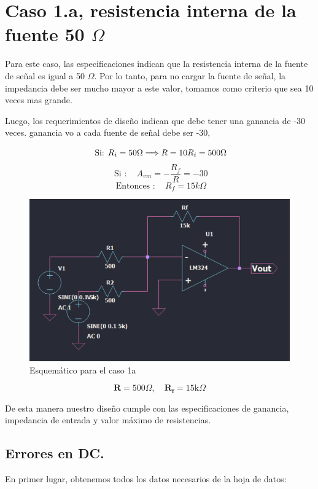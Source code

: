 \section{Caso 1.a, resistencia interna de la fuente 50 $\Omega$}

Para este caso, las especificaciones indican que la resistencia interna de la fuente de señal es igual a 50 $\Omega$. Por lo tanto, para no cargar la fuente de señal, la impedancia debe ser mucho mayor a este valor, tomamos como criterio que sea 10 veces mas grande.

Luego, los requerimientos de diseño indican que debe tener una ganancia de -30 veces. 
ganancia vo a cada fuente de señal debe ser -30, 

\[ \text { Si: } R_{i}=50 \Omega \Longrightarrow R=10 \space R_{i}=500 \Omega \]
\[ \text { Si }: \quad A_{vm} =-\frac{R_{f}}{R}=-30 \]
\[ \text { Entonces }: \quad R_{f}=15 k \Omega \]
\vspace{1em}



\begin{figure}[h!]
    \centering
    \includegraphics[width=0.90\linewidth]{img/caso1a.png}
    \caption{Esquemático para el caso 1a}
    \label{fig:caso1a}
\end{figure}


\[  \mathbf{R}=500 \Omega, \quad \mathbf{R}_{\mathbf{f}}=15 \mathrm{k} \Omega \]


De esta manera nuestro diseño cumple con las especificaciones de ganancia, impedancia de entrada y valor máximo de resistencias.

\vspace{1em}

\subsection{Errores en DC.}
En primer lugar, obtenemos todos los datos necesarios de la hoja de datos:


